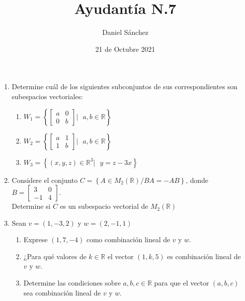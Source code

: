 \documentclass[12pt]{article}
\begin{document}
\title{Ayudant\'ia N.7}
\date{21 de Octubre 2021}
\author{Daniel S\'anchez}
\maketitle

\begin{enumerate}
    \item Determine cu\'al de los siguientes subconjuntos de sus correspondientes son subespacios vectoriales:
          \begin{enumerate}
              \item $W_1=\left\{\begin{bmatrix}
                            a & 0 \\
                            0 & b
                        \end{bmatrix}|\mbox{ }a,b\in \mathbb{R}\right\}$
              \item $W_2=\left\{\begin{bmatrix}
                            a & 1 \\
                            1 & b
                        \end{bmatrix}|\mbox{ }a,b\in \mathbb{R}\right\}$
              \item $W_3=\left\{
                        (x,y,z)\in \mathbb{R}^3|\mbox{ }y=z-3x\right\}$
          \end{enumerate}

    \item Considere el conjunto $C=\left\{A\in M_2(\mathbb{R})/BA=-AB\right\}$, donde
          $B=\begin{bmatrix}
                  3  & 0 \\
                  -1 & 4
              \end{bmatrix}$. \\Determine si $C$ es un subespacio vectorial de $M_2(\mathbb{R})$

    \item Sean $v=(1,-3,2)$ y $w=(2,-1,1)$
          \begin{enumerate}
              \item Exprese $(1,7,-4)$ como combinaci\'on lineal de $v \mbox{ y } w$.
              \item ¿Para qu\'e valores de $k \in \mathbb{R}$ el vector $(1,k,5)$ es combinaci\'on
                    lineal de $v \mbox{ y } w$.
              \item Determine las condiciones sobre $a,b,c \in \mathbb{R}$ para que el vector $(a,b,c)$ sea
                    combinaci\'on lineal de $v \mbox{ y } w$.
          \end{enumerate}


\end{enumerate}
\end{document}
